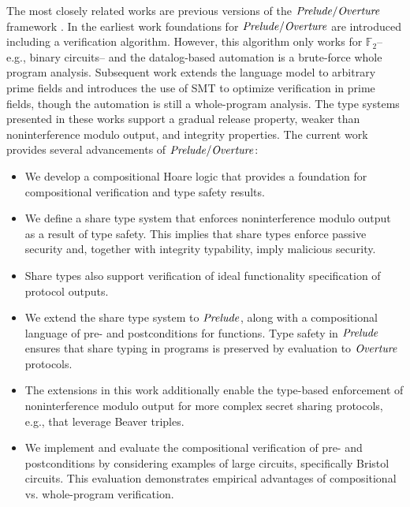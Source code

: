 The most closely related works are previous versions of the
$\mathit{Prelude}/\mathit{Overture}$ framework
\cite{skalka-near-ppdp24,skalka-near-esop25}. In the earliest work
\cite{skalka-near-ppdp24} foundations for $\mathit{Prelude}/\mathit{Overture}$ are
introduced including a verification algorithm. However, this algorithm
only works for $\mathbb{F}_2$-- e.g., binary circuits-- and the
datalog-based automation is a brute-force whole program analysis.
Subsequent work \cite{skalka-near-esop25} extends the language model
to arbitrary prime fields and introduces the use of SMT to optimize
verification in prime fields, though the automation is still a
whole-program analysis. The type systems presented in these works
support a gradual release property, weaker than noninterference
modulo output, and integrity properties. The current work provides
several advancements of $\mathit{Prelude}/\mathit{Overture}$:
\begin{itemize}
\item We develop a compositional Hoare logic that provides a foundation for
  compositional verification and type safety results.
\item We define a share type system that enforces noninterference modulo
  output as a result of type safety. This implies that share
  types enforce passive security and, together with integrity
  typability, imply malicious security.
\item Share types also support verification of ideal functionality
  specification of protocol outputs.
\item We extend the share type system to $\mathit{Prelude}$, along with
  a compositional language of pre- and postconditions for functions.
  Type safety in $\mathit{Prelude}$ ensures that share typing in programs
  is preserved by evaluation to $\mathit{Overture}$ protocols.
\item The extensions in this work additionally enable the type-based
enforcement of noninterference modulo output for more complex secret
sharing protocols, e.g., that leverage Beaver triples.
\item We implement and evaluate the compositional verification of
  pre- and postconditions by considering examples of large circuits,
  specifically Bristol circuits. This evaluation demonstrates
  empirical advantages of compositional vs. whole-program verification.
\end{itemize}

